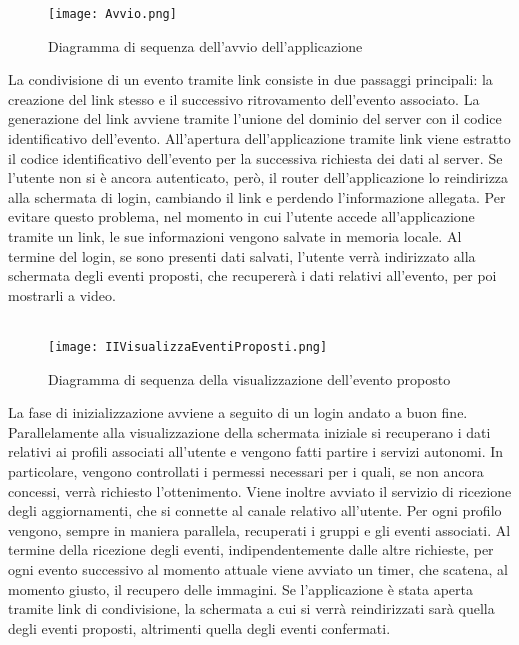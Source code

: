\begin{figure}[h!]
    \begin{center}
        \texttt{[image: Avvio.png]}
        \caption{Diagramma di sequenza dell'avvio dell'applicazione}
    \end{center}
\end{figure}

La condivisione di un evento tramite link consiste in due passaggi principali:
la creazione del link stesso e il successivo ritrovamento dell'evento associato.
La generazione del link avviene tramite
l'unione del dominio del server con il codice identificativo dell'evento.
\clearpage
All'apertura dell'applicazione tramite link viene estratto il codice identificativo dell'evento
per la successiva richiesta dei dati al server.
Se l'utente non si è ancora autenticato, però,
il router dell'applicazione lo reindirizza alla schermata di login,
cambiando il link e perdendo l'informazione allegata.
Per evitare questo problema,
nel momento in cui l'utente accede all'applicazione tramite un link,
le sue informazioni vengono salvate in memoria locale.
Al termine del login, se sono presenti dati salvati,
l'utente verrà indirizzato alla schermata degli eventi proposti,
che recupererà i dati relativi all'evento, per poi mostrarli a video.\\
\\

\begin{figure}[h!]
    \begin{center}
        \texttt{[image: IIVisualizzaEventiProposti.png]}
        \caption{Diagramma di sequenza della visualizzazione dell'evento proposto}
    \end{center}
\end{figure}

\clearpage

La fase di inizializzazione avviene a seguito di un login andato a buon fine.
Parallelamente alla visualizzazione della schermata iniziale si recuperano i dati
relativi ai profili associati all'utente e vengono fatti partire i servizi autonomi.
In particolare, vengono controllati i permessi necessari per i quali, se non ancora concessi,
verrà richiesto l'ottenimento.
Viene inoltre avviato il servizio di ricezione degli aggiornamenti,
che si connette al canale relativo all'utente.
Per ogni profilo vengono, sempre in maniera parallela, recuperati i gruppi e gli eventi associati.
Al termine della ricezione degli eventi, indipendentemente dalle altre richieste,
per ogni evento successivo al momento attuale viene avviato un timer, che scatena,
al momento giusto, il recupero delle immagini.
Se l'applicazione è stata aperta tramite link di condivisione,
la schermata a cui si verrà reindirizzati sarà quella degli eventi proposti,
altrimenti quella degli eventi confermati.\\
\\

